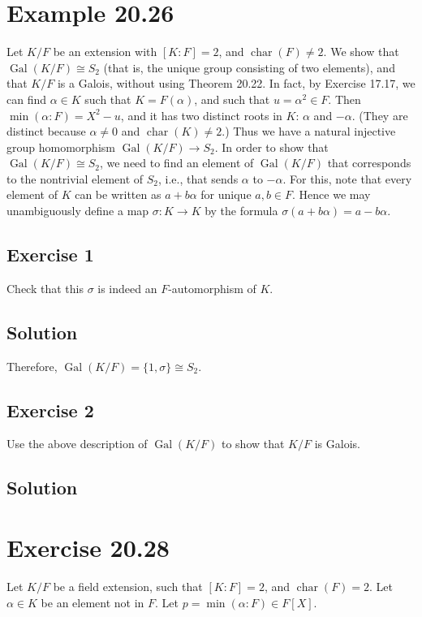\documentclass[fleqn]{article}
\DeclareMathOperator{\Gal}{Gal}
\DeclareMathOperator{\Char}{char}
\begin{document}
    \section{Example 20.26}
    Let $K/F$ be an extension with $[K : F] = 2$, and $\Char(F) \neq 2$.  We show that $\Gal(K/F) \cong S_2$ (that is, the unique group consisting of two elements), and that $K/F$ is a Galois, without using Theorem 20.22.  In fact, by Exercise 17.17, we can find $\alpha \in K$ such that $K = F(\alpha)$, and such that $u = \alpha^2 \in F$.  Then $\min(\alpha : F) = X^2 - u$, and it has two distinct roots in $K$: $\alpha$ and $-\alpha$.  (They are distinct because $\alpha \neq 0$ and $\Char(K) \neq 2$.)  Thus we have a natural injective group homomorphism $\Gal(K/F) \to S_2$.  In order to show that $\Gal(K/F) \cong S_2$, we need to find an element of $\Gal(K/F)$ that corresponds to the nontrivial element of $S_2$, i.e., that sends $\alpha$ to $-\alpha$.  For this, note that every element of $K$ can be written as $a + b\alpha$ for unique $a, b \in F$.  Hence we may unambiguously define a map $\sigma: K \to K$ by the formula $\sigma(a + b\alpha) = a - b\alpha$.
        
        \subsection{Exercise 1}
        Check that this $\sigma$ is indeed an $F$-automorphism of $K$.
            
            \subsection{Solution}
            
    Therefore, $\Gal(K/F) = \{1, \sigma\} \cong S_2$.
        
        \subsection{Exercise 2}
        Use the above description of $\Gal(K/F)$ to show that $K/F$ is Galois.
            
            \subsection{Solution}
            
    
    \section{Exercise 20.28}
    Let $K/F$ be a field extension, such that $[K : F] = 2$, and $\Char(F) = 2$.  Let $\alpha \in K$ be an element not in $F$.  Let $p = \min(\alpha : F) \in F[X]$.
        
\end{document}
